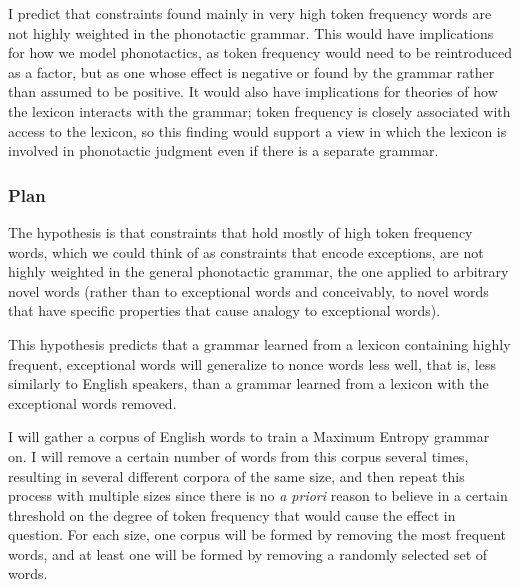 
I predict that constraints found mainly in very high token frequency words are not
highly weighted in the phonotactic grammar. This would have implications for how we model
phonotactics, as token frequency would need to be reintroduced as a factor, but as one
whose effect is negative or found by the grammar rather than assumed to be positive. It
would also have implications for theories of how the lexicon interacts with the grammar; token
frequency is closely associated with access to the lexicon, so this finding would support
a view in which the lexicon is involved in phonotactic judgment even if there is a separate
grammar.

\subsubsection{Plan}

The hypothesis is that constraints that hold mostly of high token frequency words,
which we could think of as constraints that encode exceptions, are not highly weighted
in the general phonotactic grammar, the one applied to arbitrary novel words (rather than to exceptional words
and conceivably, to novel words that have specific properties that cause analogy to exceptional words).

This hypothesis predicts that a grammar learned from a lexicon containing highly frequent, exceptional
words will generalize to nonce words less well, that is, less similarly to English speakers, than a grammar
learned from a lexicon with the exceptional words removed.

I will gather a corpus of English words to train a Maximum Entropy grammar on. I will remove
a certain number of words from this corpus several times, resulting in several different corpora
of the same size, and then repeat this process with multiple sizes since there is no \textit{a priori}
reason to believe in a certain threshold on the degree of token frequency that would cause the
effect in question. For each size, one corpus will be formed by removing the most frequent words, and
at least one will be formed by removing a randomly selected set of words.

